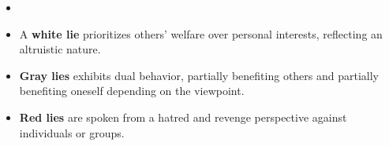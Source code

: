 \vspace{-3mm}
\begin{itemize}
[leftmargin=1mm]
\setlength\itemsep{0em}
\item[\ding{93}] \fontsize{9}{10}
\vspace{-1.5mm}
\item[\ding{93}] A \textbf{white lie} prioritizes others' welfare over personal interests, reflecting an altruistic nature.

\vspace{-1mm}
\item[\ding{93}] \textbf{Gray lies} exhibits dual behavior, partially benefiting others and partially benefiting oneself depending on the viewpoint. 
\vspace{-1mm}
\item[\ding{93}] \textbf{Red lies} are spoken from a hatred and revenge perspective against individuals or groups. 
\end{itemize}

